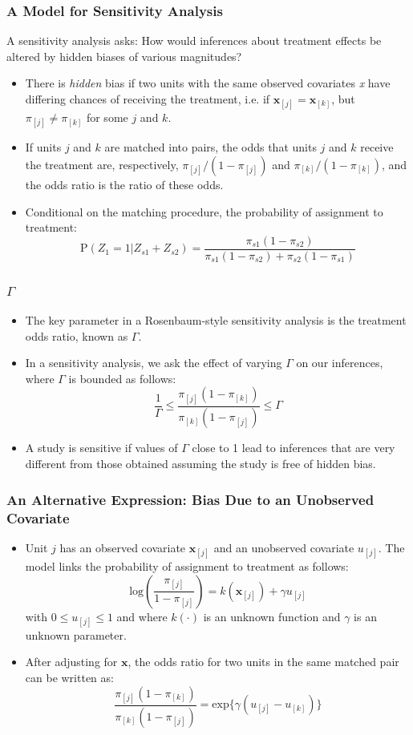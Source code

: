 \documentclass{beamer}
\begin{document}
\begin{frame}
  \frametitle{A Model for Sensitivity Analysis}
  A sensitivity analysis asks: How would inferences about treatment
  effects be altered by hidden biases of various magnitudes?
\begin{itemize}
\item<+-> There is \emph{hidden} bias if two units with the same observed
  covariates \emph{x} have differing chances of receiving the
  treatment,  i.e. if $\mathbf{x}_{[j]} = \mathbf{x}_{[k]}$, but
  $\pi_{[j]} \neq \pi_{[k]}$ for some $j$ and $k$.
\item<+-> If units $j$ and $k$ are matched into pairs, the odds that units $j$ and
  $k$ receive the treatment are, respectively,
  $\pi_{[j]}/(1-\pi_{[j]})$ and $\pi_{[k]}/(1-\pi_{[k]})$, and the
  odds ratio is the ratio of these odds.
\item<+-> Conditional on the matching procedure, the probability of
  assignment to treatment: 
$$\textrm{P}(Z_{1}=1|Z_{s1}+Z_{s2}) = \frac{
    \pi_{s1}(1-\pi_{s2})}{\pi_{s1}(1-\pi_{s2}) + \pi_{s2}(1-\pi_{s1})} $$
\end{itemize}
\end{frame}

\begin{frame}
  \frametitle{$\Gamma$}
  \begin{itemize}
  \item<+-> The key parameter in a Rosenbaum-style sensitivity analysis is
    the treatment odds ratio, known as $\Gamma$.
  \item<+-> In a sensitivity analysis, we ask the effect of varying
    $\Gamma$ on our inferences, where $\Gamma$ is bounded as follows:
$$
\frac{1}{\Gamma} \leq
\frac{\pi_{[j]}(1-\pi_{[k]})}{\pi_{[k]}(1-\pi_{[j]})} \leq \Gamma
$$
\item<+-> A study is sensitive if values of $\Gamma$ close to 1 lead to
  inferences that are very different from those obtained assuming the
  study is free of hidden bias. 
  \end{itemize}
\end{frame}

\begin{frame}
  \frametitle{An Alternative Expression: Bias Due to an Unobserved Covariate}
  \begin{itemize}
  \item<+-> Unit $j$ has an observed covariate $\mathbf{x}_{[j]}$ and an
    unobserved covariate $u_{[j]}$. The model links the probability of
    assignment to treatment as follows:
$$\textrm{log}\left(\frac{\pi_{[j]}}{1- \pi_{[j]}} \right)=
k(\mathbf{x}_{[j]})+\gamma u_{[j]}$$ with $0\leq u_{[j]} \leq 1$ and
where $k(\cdot)$ is an unknown function and $\gamma$ is an unknown
parameter. 
\item<+-> After adjusting for $\mathbf{x}$, the odds ratio for two units
  in the same matched pair can be written as:
$$\frac{\pi_{[j]}(1-\pi_{[k]})}{\pi_{[k]}(1-\pi_{[j]})}  = \textrm{exp}\{\gamma(u_{[j]}-u_{[k]})\}  $$
  \end{itemize}
\end{frame}
\end{document}
